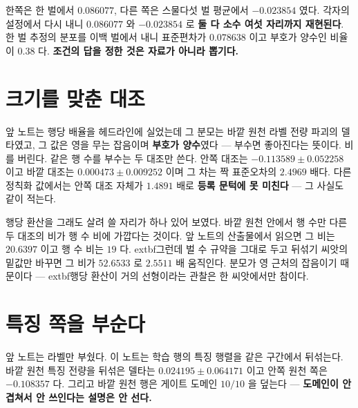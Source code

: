 
한쪽은 한 벌에서 $0.086077$, 다른 쪽은 스물다섯 벌 평균에서 $-0.023854$ 였다. 각자의 설정에서 다시 내니 $0.086077$ 와 $-0.023854$ 로 \textbf{둘 다 소수 여섯 자리까지 재현된다}. 한 벌 추정의 분포를 이백 벌에서 내니 표준편차가 $0.078638$ 이고 부호가 양수인 비율이 $0.38$ 다. \textbf{조건의 답을 정한 것은 자료가 아니라 뽑기다.}

\section{크기를 맞춘 대조}


앞 노트는 행당 배율을 헤드라인에 실었는데 그 분모는 바깥 원천 라벨 전량 파괴의 델타였고, 그 값은 영을 무는 잡음이며 \textbf{부호가 양수}였다 --- 부수면 좋아진다는 뜻이다. 비를 버린다. 같은 행 수를 부수는 두 대조만 쓴다. 안쪽 대조는 $-0.113589 \pm 0.052258$ 이고 바깥 대조는 $0.000473 \pm 0.009252$ 이며 그 차는 짝 표준오차의 $2.4969$ 배다. 다른 정칙화 값에서는 안쪽 대조 자체가 $1.4891$ 배로 \textbf{등록 문턱에 못 미친다} --- 그 사실도 같이 적는다.

행당 환산을 그래도 살려 쓸 자리가 하나 있어 보였다. 바깥 원천 안에서 행 수만 다른 두 대조의 비가 행 수 비에 가깝다는 것이다. 앞 노트의 산출물에서 읽으면 그 비는 $20.6397$ 이고 행 수 비는 $19$ 다. 	extbf{그런데 벌 수 규약을 그대로 두고 뒤섞기 씨앗의 밑값만 바꾸면} 그 비가 $52.6533$ 로 $2.5511$ 배 움직인다. 분모가 영 근처의 잡음이기 때문이다 --- 	extbf{행당 환산이 거의 선형이라는 관찰은 한 씨앗에서만 참이다.}

\section{특징 쪽을 부순다}


앞 노트는 라벨만 부쉈다. 이 노트는 학습 행의 특징 행렬을 같은 구간에서 뒤섞는다. 바깥 원천 특징 전량을 뒤섞은 델타는 $0.024195 \pm 0.064171$ 이고 안쪽 원천 쪽은 $-0.108357$ 다. 그리고 바깥 원천 행은 게이트 도메인 $10 / 10$ 을 덮는다 --- \textbf{도메인이 안 겹쳐서 안 쓰인다는 설명은 안 선다.}

